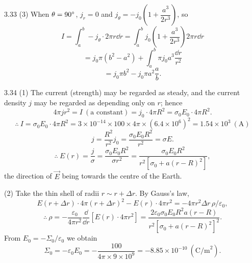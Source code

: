 \begin{solution}{3.33}
(3) When $\theta=90^{\circ}$, $j_r=0$ and $j_\theta=-j_0\left(1+\dfrac{a^3}{2r^3}\right)$, so
\[
I=\int_a^b -j_\theta\cdot2\pi r\dd r
=\int_a^b j_0\left(1+\frac{a^3}{2r^3}\right)2\pi r\dd r
\]
\[
=j_0\pi\left(b^2-a^2\right)+\int_a^b\pi j_0a^3\frac{\dd r}{r^2}
\]
\[
=j_0\pi b^2-j_0\pi a^2\frac{a}{b}.
\]
\end{solution}

\begin{solution}{3.34}
(1) The current (strength) may be regarded as steady, and the current density $j$ may be regarded as depending only on $r$; hence
\[
4\pi jr^2=I\ (\text{a constant})=j_0\cdot4\pi R^2=\sigma_0E_0\cdot4\pi R^2.
\]
\[
\therefore\ I=\sigma_0E_0\cdot4\pi R^2=3\times10^{-14}\times100\times4\pi\times\left(6.4\times10^6\right)^2=1.54\times10^3\ (\text{A})
\]
\[
j=\frac{R^2}{r^2}j_0=\frac{\sigma_0E_0R^2}{r^2}=\sigma E.
\]
\[
\therefore\ E(r)=\frac{j}{\sigma}=\frac{\sigma_0E_0R^2}{\sigma r^2}
=\frac{\sigma_0E_0R^2}{r^2\left[\sigma_0+a(r-R)^2\right]},
\]
the direction of $\vec{E}$ being towards the centre of the Earth.

(2) Take the thin shell of radii $r\sim r+\Delta r$. By Gauss's law,
\[
E(r+\Delta r)\cdot4\pi(r+\Delta r)^2-E(r)\cdot4\pi r^2=-4\pi r^2\Delta r\,\rho/\varepsilon_0,
\]
\[
\therefore\ \rho=-\frac{\varepsilon_0}{4\pi r^2}\frac{\dd}{\dd r}\left[E(r)\cdot4\pi r^2\right]
=\frac{2\varepsilon_0\sigma_0E_0R^2a(r-R)}{r^2\left[\sigma_0+a(r-R)^2\right]^2}.
\]
From $E_0=-\Sigma_0/\varepsilon_0$ we obtain
\[
\Sigma_0=-\varepsilon_0E_0=-\frac{100}{4\pi\times9\times10^9}=-8.85\times10^{-10}\ \left(\text{C/m}^2\right).
\]


\end{solution}
